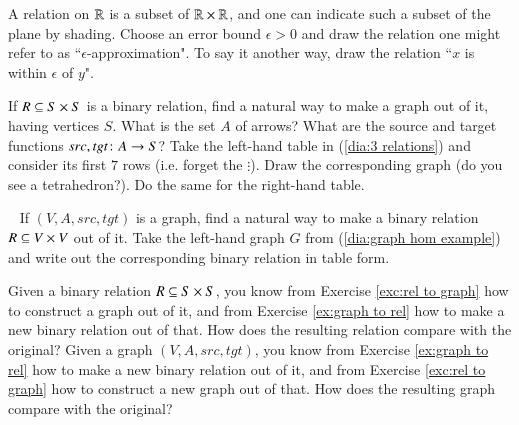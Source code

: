 \begin{exercise}
A relation on $\RR$ is a subset of $\RR\times\RR$, and one can indicate such a subset of the plane by shading. Choose an error bound $\epsilon>0$ and draw the relation one might refer to as ``$\epsilon$-approximation". To say it another way, draw the relation ``$x$ is within $\epsilon$ of $y$".
\end{exercise}

\begin{exercise}\label{exc:rel to graph}

\sexc If $R\ss S\times S$ is a binary relation, find a natural way to make a graph out of it, having vertices $S$. 
\next What is the set $A$ of arrows? 
\next What are the source and target functions $src,tgt\taking A\to S$?
\next Take the left-hand table in (\ref{dia:3 relations}) and consider its first $7$ rows (i.e. forget the $\vdots$). Draw the corresponding graph (do you see a tetrahedron?). 
\next Do the same for the right-hand table.
\endsexc
\end{exercise}

\begin{exercise}\label{ex:graph to rel}~
\sexc If $(V,A,src,tgt)$ is a graph, find a natural way to make a binary relation $R\ss V\times V$ out of it. 
\next Take the left-hand graph $G$ from (\ref{dia:graph hom example}) and write out the corresponding binary relation in table form.
\endsexc
\end{exercise}

\begin{exercise}
\sexc Given a binary relation $R\ss S\times S$, you know from Exercise \ref{exc:rel to graph} how to construct a graph out of it, and from Exercise \ref{ex:graph to rel} how to make a new binary relation out of that. How does the resulting relation compare with the original?
\next Given a graph $(V,A,src,tgt)$, you know from Exercise \ref{ex:graph to rel} how to make a new binary relation out of it, and from Exercise \ref{exc:rel to graph} how to construct a new graph out of that. How does the resulting graph compare with the original? 
\endsexc
\end{exercise}




